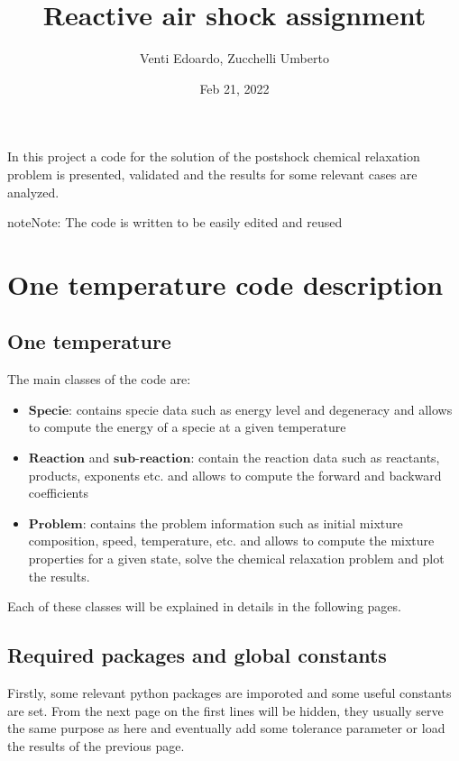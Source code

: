 \documentclass[letterpaper,10pt,english]{jupyterBook}
\title{Reactive air shock assignment}
\date{Feb 21, 2022}
\author{Venti Edoardo, Zucchelli Umberto}
\begin{document}
\pagestyle{empty}
\sphinxmaketitle
\pagestyle{plain}
\sphinxtableofcontents
\pagestyle{normal}
\label{\detokenize{intro::doc}}


\sphinxAtStartPar
In this project a code for the solution of the post\sphinxhyphen{}shock chemical relaxation problem is presented, validated and the results for some relevant cases are analyzed.

\begin{sphinxadmonition}{note}{Note:}
\sphinxAtStartPar
The code is written to be easily edited and re\sphinxhyphen{}used
\end{sphinxadmonition}


\part{One temperature code description}


\chapter{One temperature}
\label{\detokenize{1_Temperature/1T_code_structure:one-temperature}}\label{\detokenize{1_Temperature/1T_code_structure::doc}}
\sphinxAtStartPar
The main classes of the code are:
\begin{itemize}
\item {} 
\sphinxAtStartPar
\(\textbf{Specie}\): contains specie data such as energy level and degeneracy and allows to compute the energy of a specie at a given temperature

\item {} 
\sphinxAtStartPar
\(\textbf{Reaction}\) and \(\textbf{sub-reaction}\): contain the reaction data such as reactants, products, exponents etc. and allows to compute the forward and backward coefficients

\item {} 
\sphinxAtStartPar
\(\textbf{Problem}\): contains the problem information such as initial mixture composition, speed, temperature, etc. and allows to compute the mixture properties for a given state, solve the chemical relaxation problem and plot the results.

\end{itemize}

\sphinxAtStartPar
Each of these classes will be explained in details in the following pages.


\chapter{Required packages and global constants}
\label{\detokenize{1_Temperature/1T_code_structure:required-packages-and-global-constants}}
\sphinxAtStartPar
Firstly, some relevant python packages are imporoted and some useful constants are set. From the next page on the first lines will be hidden, they usually serve the same purpose as here and eventually add some tolerance parameter or load the results of the previous page.
\end{document}
